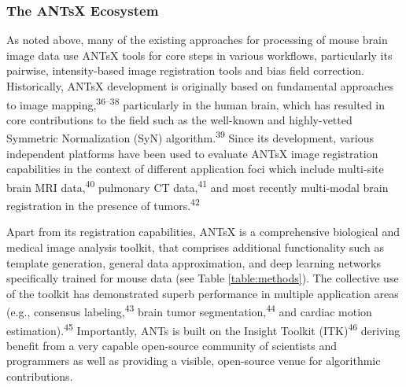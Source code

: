 \documentclass[
  12pt,
]{article}
\begin{document}
\hypertarget{the-antsx-ecosystem}{%
\subsubsection*{The ANTsX Ecosystem}\label{the-antsx-ecosystem}}

As noted above, many of the existing approaches for processing of mouse
brain image data use ANTsX tools for core steps in various workflows,
particularly its pairwise, intensity-based image registration tools and
bias field correction. Historically, ANTsX development is originally
based on fundamental approaches to image
mapping,\textsuperscript{36--38} particularly in the human brain, which
has resulted in core contributions to the field such as the well-known
and highly-vetted Symmetric Normalization (SyN)
algorithm.\textsuperscript{39} Since its development, various
independent platforms have been used to evaluate ANTsX image
registration capabilities in the context of different application foci
which include multi-site brain MRI data,\textsuperscript{40} pulmonary
CT data,\textsuperscript{41} and most recently multi-modal brain
registration in the presence of tumors.\textsuperscript{42}



Apart from its registration capabilities, ANTsX is a comprehensive
biological and medical image analysis toolkit, that comprises additional
functionality such as template generation, general data approximation,
and deep learning networks specifically trained for mouse data (see
Table \ref{table:methods}). The collective use of the toolkit has
demonstrated superb performance in multiple application areas (e.g.,
consensus labeling,\textsuperscript{43} brain tumor
segmentation,\textsuperscript{44} and cardiac motion
estimation).\textsuperscript{45} Importantly, ANTs is built on the
Insight Toolkit (ITK)\textsuperscript{46} deriving benefit from a very
capable open-source community of scientists and programmers as well as
providing a visible, open-source venue for algorithmic contributions.
\end{document}
